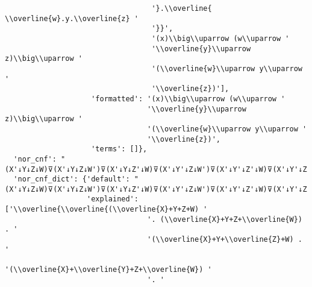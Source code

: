 \begin{verbatim}
                                  '}.\\overline{ \\overline{w}.y.\\overline{z} '
                                  '}}',
                                  '(x)\\big\\uparrow (w\\uparrow '
                                  '\\overline{y}\\uparrow z)\\big\\uparrow '
                                  '(\\overline{w}\\uparrow y\\uparrow '
                                  '\\overline{z})'],
                    'formatted': '(x)\\big\\uparrow (w\\uparrow '
                                 '\\overline{y}\\uparrow z)\\big\\uparrow '
                                 '(\\overline{w}\\uparrow y\\uparrow '
                                 '\\overline{z})',
                    'terms': []},
  'nor_cnf': "(X'↓Y↓Z↓W)⊽(X'↓Y↓Z↓W')⊽(X'↓Y↓Z'↓W)⊽(X'↓Y'↓Z↓W')⊽(X'↓Y'↓Z'↓W)⊽(X'↓Y'↓Z'↓W')",
  'nor_cnf_dict': {'default': "(X'↓Y↓Z↓W)⊽(X'↓Y↓Z↓W')⊽(X'↓Y↓Z'↓W)⊽(X'↓Y'↓Z↓W')⊽(X'↓Y'↓Z'↓W)⊽(X'↓Y'↓Z'↓W')",
                   'explained': ['\\overline{\\overline{(\\overline{X}+Y+Z+W) '
                                 '. (\\overline{X}+Y+Z+\\overline{W}) . '
                                 '(\\overline{X}+Y+\\overline{Z}+W) . '
                                 '(\\overline{X}+\\overline{Y}+Z+\\overline{W}) '
                                 '. '

\end{verbatim}
